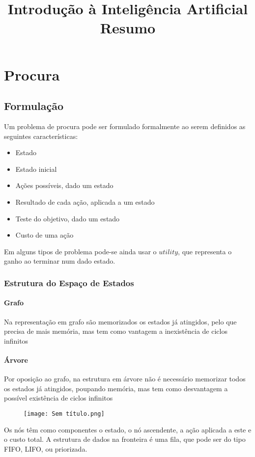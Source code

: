 \documentclass[10pt,a4paper]{report}
\title{\LARGE{Introdução à Inteligência Artificial} \\ \vspace{0.5cm} \normalsize{Resumo}}
\date{}
\begin{document}
\maketitle
\tableofcontents

\chapter{Procura}
\section{Formulação}
Um problema de procura pode ser formulado formalmente ao serem definidos as seguintes características:
\begin{itemize}
\item Estado
\item Estado inicial
\item Ações possíveis, dado um estado
\item Resultado de cada ação, aplicada a um estado
\item Teste do objetivo, dado um estado
\item Custo de uma ação
\end{itemize}
Em alguns tipos de problema pode-se ainda usar o $utility$, que representa o ganho ao terminar num dado estado.
\subsection{Estrutura do Espaço de Estados}
\subsubsection{Grafo}
Na representação em grafo são memorizados os estados já atingidos, pelo que precisa de mais memória, mas tem como vantagem a inexistência de ciclos infinitos
\subsubsection{Árvore}
Por oposição ao grafo, na estrutura em árvore não é necessário memorizar todos os estados já atingidos, poupando memória, mas tem como desvantagem a possível existência de ciclos infinitos
\begin{figure}[H]
\centering
\texttt{[image: Sem título.png]}
\end{figure}
Os nós têm como componentes o estado, o nó ascendente, a ação aplicada a este e o custo total. A estrutura de dados na fronteira é uma fila, que pode ser do tipo FIFO, LIFO, ou priorizada.
\end{document}
